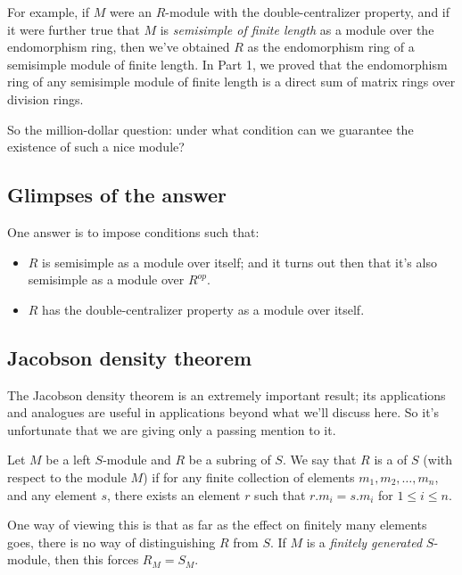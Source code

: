 \documentclass[a4paper]{amsart}
\begin{document}
For example, if $M$ were an $R$-module with the double-centralizer
property, and if it were further true that $M$ is {\em semisimple of
  finite length} as a module over the endomorphism ring, then we've
obtained $R$ as the endomorphism ring of a semisimple module of finite
length. In Part 1, we proved that the endomorphism ring of any
semisimple module of finite length is a direct sum of matrix rings
over division rings.

So the million-dollar question: under what condition can we guarantee
the existence of such a nice module?

\subsection{Glimpses of the answer}

One answer is to impose conditions such that:

\begin{itemize}

\item $R$ is semisimple as a module over itself; and it turns out then
  that it's also semisimple as a module over $R^{op}$.

\item $R$ has the double-centralizer property as a module over itself.

\end{itemize}

\subsection{Jacobson density theorem}

The Jacobson density theorem is an extremely important result; its
applications and analogues are useful in applications beyond what
we'll discuss here. So it's unfortunate that we are giving only a
passing mention to it.

\begin{definer}
  Let $M$ be a left $S$-module and $R$ be a subring of $S$. We say
  that $R$ is a  of $S$ (with respect to the
  module $M$) if for any finite collection of elements $m_1, m_2,
  \ldots, m_n$, and any element $s$, there exists an element $r$ such
  that $r.m_i = s.m_i$ for $1 \le i \le n$.
\end{definer}

One way of viewing this is that as far as the effect on finitely many
elements goes, there is no way of distinguishing $R$ from $S$. If $M$
is a {\em finitely generated} $S$-module, then this forces $R_M =
S_M$.
\end{document}

